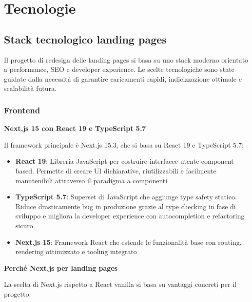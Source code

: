 \chapter{Tecnologie}

\section{Stack tecnologico landing pages}
Il progetto di redesign delle landing pages si basa su uno stack moderno orientato a performance, SEO e developer experience. Le scelte tecnologiche sono state guidate dalla necessità di garantire caricamenti rapidi, indicizzazione ottimale e scalabilità futura.

\subsection{Frontend}

\textbf{Next.js 15 con React 19 e TypeScript 5.7}

Il framework principale è Next.js 15.3, che si basa su React 19 e TypeScript 5.7:

\begin{itemize}
  \item \textbf{React 19}: Libreria JavaScript per costruire interfacce utente component-based. Permette di creare UI dichiarative, riutilizzabili e facilmente manutenibili attraverso il paradigma a componenti
  
  \item \textbf{TypeScript 5.7}: Superset di JavaScript che aggiunge type safety statico. Riduce drasticamente bug in produzione grazie al type checking in fase di sviluppo e migliora la developer experience con autocompletion e refactoring sicuro
  
  \item \textbf{Next.js 15}: Framework React che estende le funzionalità base con routing, rendering ottimizzato e tooling integrato
\end{itemize}

\textbf{Perché Next.js per landing pages}

La scelta di Next.js rispetto a React vanilla si basa su vantaggi concreti per il progetto:

